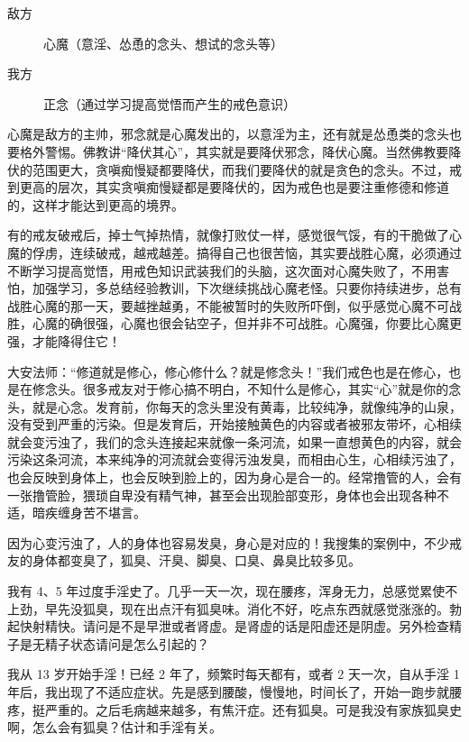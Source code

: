 \begin{description}
    \item[敌方] 心魔（意淫、怂恿的念头、想试的念头等）
    \item[我方] 正念（通过学习提高觉悟而产生的戒色意识）
\end{description}

心魔是敌方的主帅，邪念就是心魔发出的，以意淫为主，还有就是怂恿类的念头也要格外警惕。佛教讲“降伏其心”，其实就是要降伏邪念，降伏心魔。当然佛教要降伏的范围更大，贪嗔痴慢疑都要降伏，而我们要降伏的就是贪色的念头。不过，戒到更高的层次，其实贪嗔痴慢疑都是要降伏的，因为戒色也是要注重修德和修道的，这样才能达到更高的境界。

有的戒友破戒后，掉士气掉热情，就像打败仗一样，感觉很气馁，有的干脆做了心魔的俘虏，连续破戒，越戒越差。搞得自己也很苦恼，其实要战胜心魔，必须通过不断学习提高觉悟，用戒色知识武装我们的头脑，这次面对心魔失败了，不用害怕，加强学习，多总结经验教训，下次继续挑战心魔老怪。只要你持续进步，总有战胜心魔的那一天，要越挫越勇，不能被暂时的失败所吓倒，似乎感觉心魔不可战胜，心魔的确很强，心魔也很会钻空子，但并非不可战胜。心魔强，你要比心魔更强，才能降得住它！

大安法师：“修道就是修心，修心修什么？就是修念头！”我们戒色也是在修心，也是在修念头。很多戒友对于修心搞不明白，不知什么是修心，其实“心”就是你的念头，就是心念。发育前，你每天的念头里没有黄毒，比较纯净，就像纯净的山泉，没有受到严重的污染。但是发育后，开始接触黄色的内容或者被邪友带坏，心相续就会变污浊了，我们的念头连接起来就像一条河流，如果一直想黄色的内容，就会污染这条河流，本来纯净的河流就会变得污浊发臭，而相由心生，心相续污浊了，也会反映到身体上，也会反映到脸上的，因为身心是合一的。经常撸管的人，会有一张撸管脸，猥琐自卑没有精气神，甚至会出现脸部变形，身体也会出现各种不适，暗疾缠身苦不堪言。

因为心变污浊了，人的身体也容易发臭，身心是对应的！我搜集的案例中，不少戒友的身体都变臭了，狐臭、汗臭、脚臭、口臭、鼻臭比较多见。

\begin{case}
    我有 4、5 年过度手淫史了。几乎一天一次，现在腰疼，浑身无力，总感觉累使不上劲，早先没狐臭，现在出点汗有狐臭味。消化不好，吃点东西就感觉涨涨的。勃起快射精快。请问是不是早泄或者肾虚。是肾虚的话是阳虚还是阴虚。另外检查精子是无精子状态请问是怎么引起的？
\end{case}

\begin{case}
    我从 13 岁开始手淫！已经 2 年了，频繁时每天都有，或者 2 天一次，自从手淫 1 年后，我出现了不适应症状。先是感到腰酸，慢慢地，时间长了，开始一跑步就腰疼，挺严重的。之后毛病越来越多，有焦汗症。还有狐臭。可是我没有家族狐臭史啊，怎么会有狐臭？估计和手淫有关。
\end{case}

